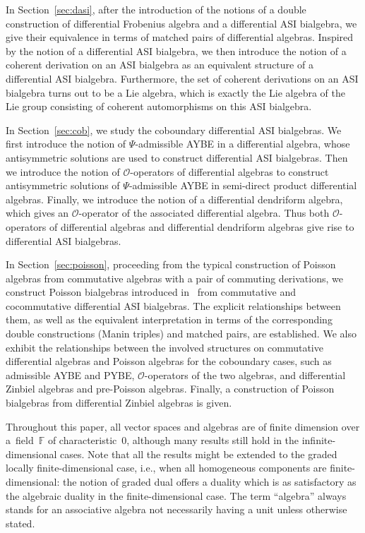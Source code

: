 \documentclass[pdftex]{sigma}
\numberwithin{equation}{section}
\begin{document}
In Section~\ref{sec:dasi}, after the introduction of the notions
of a double construction of differential Frobenius algebra and a
differential ASI bialgebra, we give their equivalence in terms of
matched pairs of differential algebras. Inspired by the notion of
a differential ASI bialgebra, we then introduce the notion of a
coherent derivation on an ASI bialgebra as an equivalent structure
of a differential ASI bialgebra. Furthermore, the set of coherent
derivations on an ASI bialgebra turns out to be a Lie algebra,
which is exactly the Lie algebra of the Lie group consisting of
coherent automorphisms on this ASI bialgebra.

In Section~\ref{sec:cob}, we study the coboundary differential ASI bialgebras.
We first introduce the notion of $\Psi$-admissible AYBE in a differential algebra,
whose antisymmetric solutions are used to construct differential ASI bialgebras.
Then we introduce the notion of $\mathcal{O}$-operators of differential algebras to construct antisymmetric solutions of $\Psi$-admissible AYBE in semi-direct product differential algebras.
Finally, we introduce the notion of a differential dendriform
algebra, which gives an $\mathcal{O}$-operator of the
associated differential algebra. Thus both $\mathcal O$-operators
of differential algebras and differential dendriform algebras give rise to
differential ASI bialgebras.

In Section~\ref{sec:poisson}, proceeding from the typical
construction of Poisson algebras from commutative algebras with a
pair of commuting derivations, we construct Poisson bialgebras
introduced in~\cite{ni2013poisson} from commutative and
cocommutative differential ASI bialgebras.
The explicit relationships between them, as well as the equivalent
interpretation in terms of the corresponding double constructions
(Manin triples) and matched pairs, are established. We also
exhibit the relationships between the involved structures on
commutative differential algebras and Poisson algebras for the
coboundary cases, such as admissible AYBE and PYBE,
$\mathcal{O}$-operators of the two algebras, and differential
Zinbiel algebras and pre-Poisson algebras.
Finally, a construction of Poisson bialgebras from differential Zinbiel algebras is given.

Throughout this paper, all vector spaces and algebras are of finite dimension over a~field~$\mathbb{F}$ of characteristic~$0$, although many results still hold in the infinite-dimensional cases.
Note that all the results might be extended to the graded locally finite-dimensional case, i.e., when all homogeneous components are finite-dimensional: the notion of graded dual offers a duality which is as satisfactory as the algebraic duality in the finite-dimensional case.
The term ``algebra'' always stands for an associative algebra not necessarily having a unit unless otherwise stated.
\end{document}
